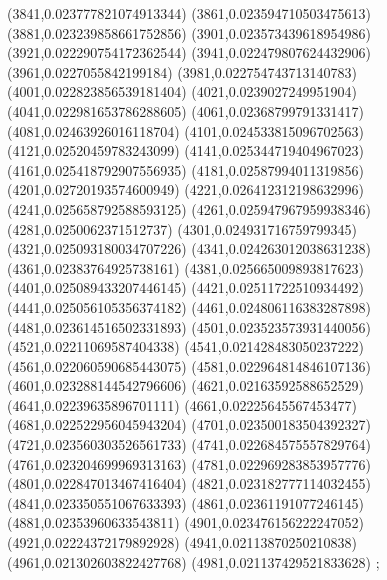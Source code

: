 {(3841,0.023777821074913344)
(3861,0.023594710503475613)
(3881,0.023239858661752856)
(3901,0.023573439618954986)
(3921,0.022290754172362544)
(3941,0.022479807624432906)
(3961,0.0227055842199184)
(3981,0.022754743713140783)
(4001,0.022823856539181404)
(4021,0.0239027249951904)
(4041,0.022981653786288605)
(4061,0.02368799791331417)
(4081,0.02463926016118704)
(4101,0.024533815096702563)
(4121,0.02520459783243099)
(4141,0.025344719404967023)
(4161,0.025418792907556935)
(4181,0.02587994011319856)
(4201,0.02720193574600949)
(4221,0.026412312198632996)
(4241,0.025658792588593125)
(4261,0.025947967959938346)
(4281,0.0250062371512737)
(4301,0.024931716759799345)
(4321,0.025093180034707226)
(4341,0.024263012038631238)
(4361,0.02383764925738161)
(4381,0.025665009893817623)
(4401,0.025089433207446145)
(4421,0.02511722510934492)
(4441,0.025056105356374182)
(4461,0.024806116383287898)
(4481,0.023614516502331893)
(4501,0.023523573931440056)
(4521,0.02211069587404338)
(4541,0.021428483050237222)
(4561,0.022060590685443075)
(4581,0.022964814846107136)
(4601,0.023288144542796606)
(4621,0.02163592588652529)
(4641,0.02239635896701111)
(4661,0.02225645567453477)
(4681,0.022522956045943204)
(4701,0.023500183504392327)
(4721,0.023560303526561733)
(4741,0.022684575557829764)
(4761,0.023204699969313163)
(4781,0.022969283853957776)
(4801,0.022847013467416404)
(4821,0.023182777114032455)
(4841,0.023350551067633393)
(4861,0.02361191077246145)
(4881,0.02353960633543811)
(4901,0.023476156222247052)
(4921,0.02224372179892928)
(4941,0.02113870250210838)
(4961,0.021302603822427768)
(4981,0.021137429521833628)
};
